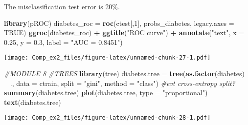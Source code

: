 \documentclass[]{article}
\newenvironment{Shaded}{\begin{snugshade}}{\end{snugshade}}
\newcommand{\KeywordTok}[1]{\textcolor[rgb]{0.13,0.29,0.53}{\textbf{#1}}}
\newcommand{\DataTypeTok}[1]{\textcolor[rgb]{0.13,0.29,0.53}{#1}}
\newcommand{\DecValTok}[1]{\textcolor[rgb]{0.00,0.00,0.81}{#1}}
\newcommand{\FloatTok}[1]{\textcolor[rgb]{0.00,0.00,0.81}{#1}}
\newcommand{\StringTok}[1]{\textcolor[rgb]{0.31,0.60,0.02}{#1}}
\newcommand{\CommentTok}[1]{\textcolor[rgb]{0.56,0.35,0.01}{\textit{#1}}}
\newcommand{\OtherTok}[1]{\textcolor[rgb]{0.56,0.35,0.01}{#1}}
\newcommand{\OperatorTok}[1]{\textcolor[rgb]{0.81,0.36,0.00}{\textbf{#1}}}
\newcommand{\NormalTok}[1]{#1}
\begin{document}
The misclassification test error is 20\%.

\begin{Shaded}
\begin{Highlighting}[]
 \KeywordTok{library}\NormalTok{(pROC)}
\NormalTok{diabetes_roc =}\StringTok{ }\KeywordTok{roc}\NormalTok{(ctest[,}\DecValTok{1}\NormalTok{], probs_diabetes, }\DataTypeTok{legacy.axes =} \OtherTok{TRUE}\NormalTok{)}
\KeywordTok{ggroc}\NormalTok{(diabetes_roc) }\OperatorTok{+}\StringTok{ }\KeywordTok{ggtitle}\NormalTok{(}\StringTok{"ROC curve"}\NormalTok{) }\OperatorTok{+}\StringTok{ }\KeywordTok{annotate}\NormalTok{(}\StringTok{"text"}\NormalTok{, }\DataTypeTok{x =} \FloatTok{0.25}\NormalTok{, }\DataTypeTok{y =} \FloatTok{0.3}\NormalTok{, }
    \DataTypeTok{label =} \StringTok{"AUC = 0.8451"}\NormalTok{)}
\end{Highlighting}
\end{Shaded}

\texttt{[image: Comp\_ex2\_files/figure-latex/unnamed-chunk-27-1.pdf]}

\begin{Shaded}
\end{Shaded}

\begin{Shaded}
\begin{Highlighting}[]
\CommentTok{#MODULE 8}
\CommentTok{#TREES}
\KeywordTok{library}\NormalTok{(tree)}
\NormalTok{diabetes.tree =}\StringTok{ }\KeywordTok{tree}\NormalTok{(}\KeywordTok{as.factor}\NormalTok{(diabetes) }\OperatorTok{~}\StringTok{ }\NormalTok{., }\DataTypeTok{data =}\NormalTok{ ctrain, }\DataTypeTok{split =} \StringTok{"gini"}\NormalTok{, }\DataTypeTok{method =} \StringTok{"class"}\NormalTok{) }\CommentTok{#evt cross-entropy split? }
\KeywordTok{summary}\NormalTok{(diabetes.tree)}
\KeywordTok{plot}\NormalTok{(diabetes.tree, }\DataTypeTok{type =} \StringTok{"proportional"}\NormalTok{)}
\KeywordTok{text}\NormalTok{(diabetes.tree)}
\end{Highlighting}
\end{Shaded}

\texttt{[image: Comp\_ex2\_files/figure-latex/unnamed-chunk-28-1.pdf]}
\end{document}
